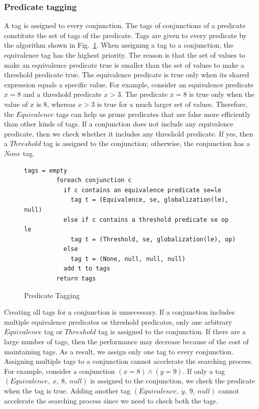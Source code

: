 \documentclass{sigplanconf}
\begin{document}
\subsubsection{Predicate tagging}
A tag is assigned to every conjunction. The tags of 
conjunctions of a predicate constitute the set of tags of the predicate. 
Tags are given to every predicate by the algorithm shown in
Fig.~\ref{fig:tagging}. 
When assigning a tag to a conjunction, the equivalence tag has the highest 
priority. The reason is that the set of values to make an equivalence predicate
true is smaller than the set of values to make a threshold predicate true. The equivalence predicate is true 
only when its shared expression equals a specific value. 
For example, consider an equivalence 
predicate $x = 8$ and a threshold predicate $x > 3$. The predicate $x = 8$ is true only when 
the value of $x$ is $8$, whereas $x > 3$ is true for a much larger set of values.
Therefore, the $Equivalence$ tags can help us prune
predicates that are false more efficiently than other kinds of
tags. 
If a conjunction does not 
include any equivalence predicate, then we check whether it 
includes any threshold predicate. If yes, then a $Threshold$ tag is assigned 
to the conjunction; otherwise, the conjunction has a $None$ tag. 

\begin{figure}[ht!]
    \begin{Verbatim}[fontsize=\footnotesize,gobble=8,frame=lines,
            framesep=3mm]
         tags = empty
         foreach conjunction c 
           if c contains an equivalence predicate se=le
             tag t = (Equivalence, se, globalization(le), null)
           else if c contains a threshold predicate se op le
             tag t = (Threshold, se, globalization(le), op)
           else 
             tag t = (None, null, null, null) 
           add t to tags 
         return tags
    \end{Verbatim}
  \caption{Predicate Tagging}
  \label{fig:tagging}
\end{figure}
Creating all tags for a conjunction is unnecessary. If a conjunction includes 
multiple equivalence predicates or threshold predicates, only one arbitrary 
$Equivalence$ tag or $Threshold$ tag is assigned to the conjunction. 
If there are a large number of tags, then the performance may decrease
because of the cost of maintaining tags. As a result, we assign only one tag to
every conjunction.
Assigning multiple tags to a 
conjunction cannot accelerate the searching process. For example, consider a 
conjunction $(x = 8) \wedge (y = 9)$. If only a tag 
$(Equivalence,\ x,\ 8,\ null)$
is assigned to the conjunction, we check the predicate when the tag is
true. Adding another tag $(Equivalence,\ y,\ 9,\ null)$ cannot accelerate the
searching process since we need to check both the tags. 
 
\end{document}
